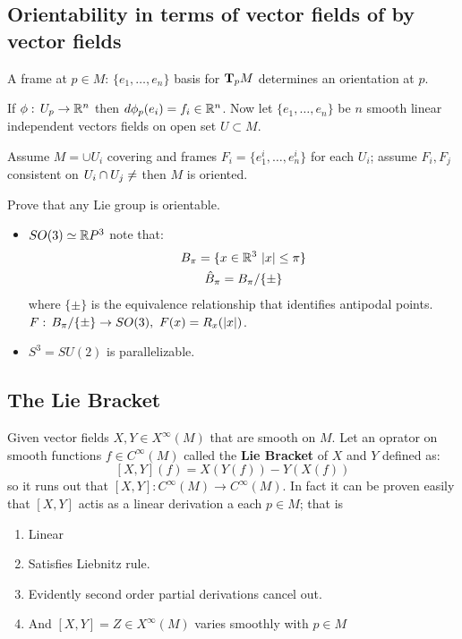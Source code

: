 \subsection{Orientability in terms of vector fields of by vector fields}
A frame at $p\in M$: $\{e_1,\ldots,e_n \}$ basis for $\text{\textbf{T}}_pM$ determines an orientation at $p$.

If $\phi:\, U_p \to \mathbb{R}^n$ then $d\phi_p(e_i)=f_i \in \mathbb{R}^n$. Now let $\{e_1,\ldots, e_n\}$ be $n$ smooth linear independent vectors fields on open set $U\subset M$.

Assume $M=\cup U_i$ covering and frames $F_i=\{e_1^i,\ldots, e_n^i\}$ for each $U_i$; assume $F_i,F_j$ consistent on $U_i\cap U_j\neq \empty$ then $M$ is oriented.

\begin{teorema}
Prove that any Lie group is orientable.
\end{teorema}

\begin{examples}
\hspace{1cm}
\begin{itemize}
\item $SO(3) \simeq \mathbb{R} P^3$ note that:
\begin{gather*}
B_\pi = \{x\in \mathbb{R}^3 \ |x| \leq \pi \}\\
\hat B_\pi = B_\pi/\{\pm \}
\end{gather*}
where $\{\pm\}$ is the equivalence relationship that identifies antipodal points. \\
$F:\, B_\pi/\{\pm\} \to SO(3),\ F(x) = R_x(|x|)$.
\item $S^3=SU(2)$ is parallelizable.
\end{itemize}
\end{examples}

\subsection{The Lie Bracket}
\begin{ddef}
Given vector fields $X,Y\in X^\infty (M)$ that are smooth on $M$. Let an oprator on smooth functions $f\in C^\infty(M)$ called the \textbf{Lie Bracket} of $X$ and $Y$ defined as:
$$[X,Y](f) = X(Y(f)) - Y(X(f))$$
so it runs out that $[X,Y]: C^\infty(M) \to C^\infty(M)$. In fact it can be proven easily that $[X,Y]$ actis as a linear derivation a each $p\in M$; that is 
\begin{enumerate}[1)]
\item Linear 
\item Satisfies Liebnitz rule.
\item Evidently second order partial derivations cancel out.
\item And $[X,Y]=Z\in X^\infty(M)$ varies smoothly with $p\in M$ 
\end{enumerate}
\end{ddef}

